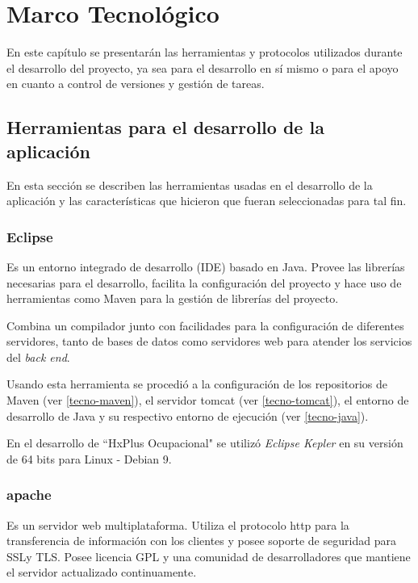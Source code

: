 \chapter{Marco Tecnológico}

En este capítulo se presentarán las herramientas y protocolos utilizados durante el desarrollo del proyecto, ya sea para el desarrollo en sí mismo o para el apoyo en cuanto a control de versiones y gestión de tareas.

    \section{Herramientas para el desarrollo de la aplicación}
    
    En esta sección se describen las herramientas usadas en el desarrollo de la aplicación y las características que hicieron que fueran seleccionadas para tal fin.
    
        \subsection{Eclipse}
        \label{tecno-eclipse}
        
        Es un entorno integrado de desarrollo (IDE) basado en Java. Provee las librerías necesarias para el desarrollo, facilita la configuración del proyecto y hace uso de herramientas como Maven para la gestión de librerías del proyecto.
        
        Combina un compilador junto con facilidades para la configuración de diferentes servidores, tanto de bases de datos como servidores web para atender los servicios del \textit{back end}.
        
        Usando esta herramienta se procedió a la configuración de los repositorios de Maven (ver \ref{tecno-maven}), el servidor tomcat (ver \ref{tecno-tomcat}), el entorno de desarrollo de Java y su respectivo entorno de ejecución (ver \ref{tecno-java}).
        
        En el desarrollo de ``HxPlus Ocupacional" se utilizó \textit{Eclipse Kepler} en su versión de 64 bits para Linux - Debian 9.
        
        \subsection{apache}
        \label{tecno-apache}
        
        Es un servidor web multiplataforma. Utiliza el protocolo http para la transferencia de información con los clientes y posee soporte de seguridad para SSLy TLS\cite{APACHE-culturacion}. Posee licencia GPL y una comunidad de desarrolladores que mantiene el servidor actualizado continuamente.
        
